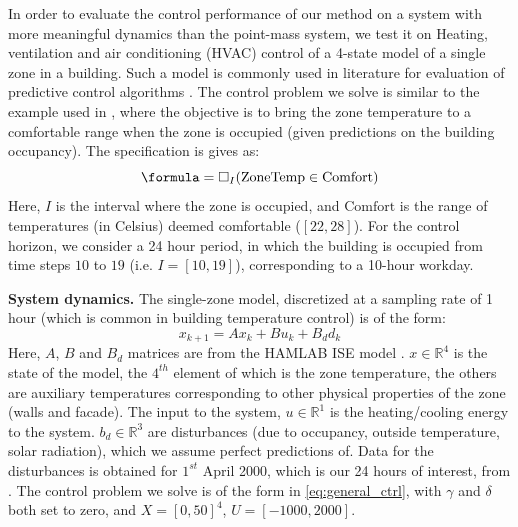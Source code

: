 
In order to evaluate the control performance of our method on a system with more meaningful dynamics than the point-mass system, we test it on Heating, ventilation and air conditioning (HVAC) control of a 4-state model of a single zone in a building. Such a model is commonly used in literature for evaluation of predictive control algorithms \cite{Jain2016}. The control problem we solve is similar to the example used in \cite{Raman14_MPCSTL}, where the objective is to bring the zone temperature to a comfortable range when the zone is occupied (given predictions on the building occupancy). The specification is gives as:
\begin{equation}
\label{eq:BldgSpec}
\formula = \always_I(\text{ZoneTemp} \in \text{Comfort})
\end{equation}
Here, $I$ is the interval where the zone is occupied, and $\text{Comfort}$ is the range of temperatures (in Celsius) deemed comfortable ($[22,28]$). For the control horizon, we consider a 24 hour period, in which the building is occupied from time steps $10$ to $19$ (i.e. $I=[10,19]$), corresponding to a 10-hour workday. 

\textbf{System dynamics.} The single-zone model, discretized at a sampling rate of 1 hour (which is common in building temperature control) is of the form:
\begin{equation}
\label{eq:bldg_dyn}
x_{k+1} = Ax_{k}+Bu_k+B_dd_k
\end{equation}
Here, $A$, $B$ and $B_d$ matrices are from the HAMLAB ISE model \cite{VanSchijndel2005}. $x \in \mathbb{R}^4$ is the state of the model, the $4^{th}$ element of which is the zone temperature, the others are auxiliary temperatures corresponding to other physical properties of the zone (walls and facade). The input to the system, $u \in \mathbb{R}^1$ is the heating/cooling energy to the system. $b_d \in \mathbb{R}^3$ are disturbances (due to occupancy, outside temperature, solar radiation), which we assume perfect predictions of. Data for the disturbances is obtained for $1^{st}$ April 2000, which is our 24 hours of interest, from \cite{VanSchijndel2005}. The control problem we solve is of the form in \eqref{eq:general_ctrl}, with $\gamma$ and $\delta$ both set to zero, and $X=[0,50]^4$, $U=[-1000,2000]$.

